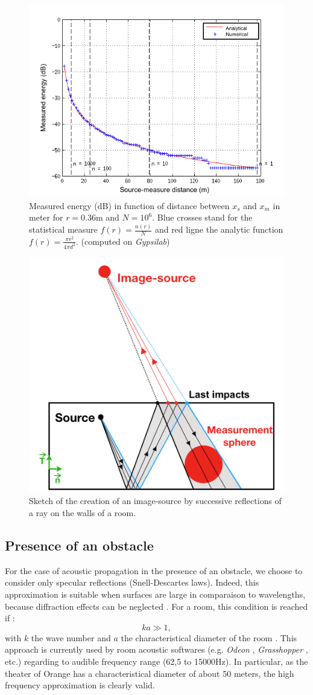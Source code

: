 \documentclass[AMA,STIX1COL]{WileyNJD-v2}
\begin{document}
\begin{figure}[t]
\centering
	\includegraphics[width=0.65\linewidth]{energie.png}
	\caption{Measured energy (dB) in function of distance between $x_s$ and $x_m$ in meter for $r = 0.36$m and $N = 10^6$. Blue crosses stand for the statistical measure $f(r) = \frac{n(r)}{N}$ and red ligne the analytic function $f(r) = \frac{\pi r^2}{4\pi d^2}$. (computed on \textit{Gypsilab})}
	\label{energie}
\end{figure}

%
\begin{figure}[t]
	\centering
	\includegraphics[width=0.5\linewidth]{schema_SI}
	\caption{Sketch of the creation of an image-source by successive reflections of a ray on the walls of a room.}
	\label{schema_SI}
\end{figure}



\subsection{Presence of an obstacle}
For the case of acoustic propagation in the presence of an obstacle, we choose to consider only specular reflections (Snell-Descartes laws). Indeed, this approximation is suitable when surfaces are large in comparaison to wavelengths, because diffraction effects can be neglected \cite{jouhaneau}. For a room, this condition is reached if :
\begin{equation}
ka \gg 1, 
\end{equation}
with $k$ the wave number and $a$ the characteristical diameter of the room \cite{hautes_freq}. This approach is currently used by room acoustic softwares (e.g. \textit{Odeon} \cite{odeon}, \textit{Grasshopper} \cite{grasshopper}, etc.) regarding to audible frequency range (62,5 to 15000Hz). In particular, as the theater of Orange has a characteristical diameter of about 50 meters, the high frequency approximation is clearly valid. 
\end{document}
